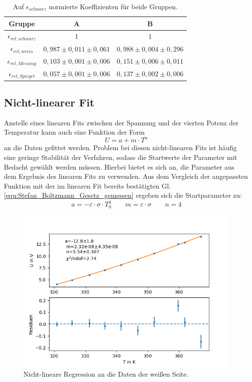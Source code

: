\documentclass[12pt,a4paper]{article}
\begin{document}
\begin{table}
\centering
\begin{tabular}{|c|c|c|}
\hline
Gruppe & A & B \\
\hline
$\epsilon_{rel,schwarz}$ & 1 & 1 \\
\hline
$\epsilon_{rel,weiss}$ & $ 0,987 \pm 0,011 \pm 0,061 $ & $ 0,988 \pm 0,004 \pm 0,296 $ \\
\hline
$\epsilon_{rel,Messing}$ & $ 0,103 \pm 0,001 \pm 0,006 $ & $ 0,151 \pm 0,006 \pm 0,011$ \\
\hline
$\epsilon_{rel,Spiegel}$ & $ 0,057 \pm 0,001 \pm 0,006 $ & $ 0,137 \pm 0,002 \pm 0,006$ \\
\hline
\end{tabular}
\caption{Auf $\epsilon_{schwarz}$ normierte Koeffizienten für beide Gruppen.}
\label{tab:Emission_relativ}
\end{table}



\subsection{Nicht-linearer Fit}
Anstelle eines linearen Fits zwischen der Spannung und der vierten Potenz der Temperatur kann auch eine Funktion der Form
\begin{equation*}
U = a + m \cdot T^n
\end{equation*}
an die Daten gefittet werden. Problem bei diesen nicht-linearen Fits ist häufig eine geringe Stabilität der Verfahren, sodass die Startwerte der Parameter mit Bedacht gewählt werden müssen. Hierbei bietet es sich an, die Parameter aus dem Ergebnis des linearen Fits zu verwenden. Aus dem Vergleich der angepassten Funktion mit der im linearen Fit bereits bestätigten Gl. \ref{equ:Stefan_Boltzmann_Gesetz_gemessen} ergeben sich die Startparameter zu:
\begin{equation*}
a = - \varepsilon \cdot \sigma \cdot T_0^4 \qquad m = \varepsilon \cdot \sigma \qquad n = 4
\end{equation*}

\begin{figure}
\centering
\includegraphics[scale=0.8]{Bilder/nichtlinear_A_weiss}
\caption{Nicht-lineare Regression an die Daten der weißen Seite.}
\label{fig:nicht_linearRegweiss_A}
\end{figure}
\end{document}
